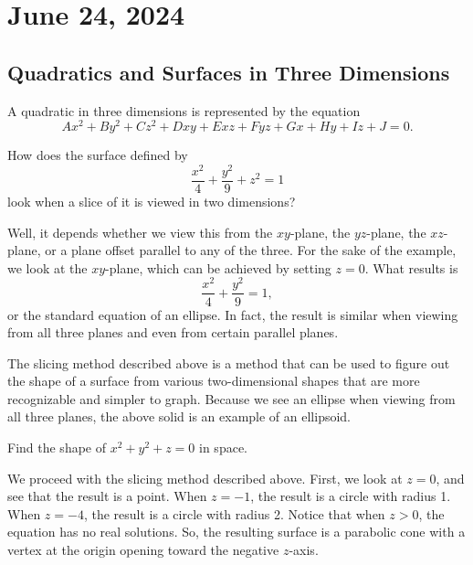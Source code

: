 \chapter{June 24, 2024}

\section{Quadratics and Surfaces in Three Dimensions}

\begin{definition}
    A quadratic in three dimensions is represented by the equation
    \[Ax^{2} + By^{2} + Cz^{2} + Dxy + Exz + Fyz + Gx + Hy + Iz + J = 0.\]
\end{definition}

\begin{example}
    How does the surface defined by
    \[\frac{x^{2}}{4} + \frac{y^{2}}{9} + z^{2} = 1\]
    look when a slice of it is viewed in two dimensions?

    \begin{soln}
        Well, it depends whether we view this from the $xy$-plane, the $yz$-plane, the $xz$-plane, or a plane offset parallel to any of the three. For the sake of the example, we look at the $xy$-plane, which can be achieved by setting $z = 0$. What results is
        \[\frac{x^{2}}{4} + \frac{y^{2}}{9} = 1,\]
        or the standard equation of an ellipse. In fact, the result is similar when viewing from all three planes and even from certain parallel planes.
    \end{soln}
\end{example}

\begin{remark}
    The slicing method described above is a method that can be used to figure out the shape of a surface from various two-dimensional shapes that are more recognizable and simpler to graph. Because we see an ellipse when viewing from all three planes, the above solid is an example of an ellipsoid.
\end{remark}

\begin{example}
    Find the shape of $x^{2} + y^{2} + z = 0$ in space.

    \begin{soln}
        We proceed with the slicing method described above. First, we look at $z = 0$, and see that the result is a point. When $z = -1$, the result is a circle with radius 1. When $z = -4$, the result is a circle with radius 2. Notice that when $z > 0$, the equation has no real solutions. So, the resulting surface is a parabolic cone with a vertex at the origin opening toward the negative $z$-axis.
    \end{soln}
\end{example}

